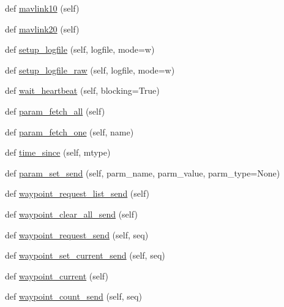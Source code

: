 \begin{DoxyCompactItemize}
\item 
def \hyperlink{classpymavlink_1_1mavutil_1_1mavfile_a2539d7b34226d566b9167f4c0bc5d7a4}{mavlink10} (self)
\item 
def \hyperlink{classpymavlink_1_1mavutil_1_1mavfile_a84eb9bd740dd761537c4fc16d0c436b7}{mavlink20} (self)
\item 
def \hyperlink{classpymavlink_1_1mavutil_1_1mavfile_a3cae7386bd175b00f8ab23316165f47a}{setup\+\_\+logfile} (self, logfile, mode=\textquotesingle{}w\textquotesingle{})
\item 
def \hyperlink{classpymavlink_1_1mavutil_1_1mavfile_af8bde63a7c980d24fd1679dca36242bf}{setup\+\_\+logfile\+\_\+raw} (self, logfile, mode=\textquotesingle{}w\textquotesingle{})
\item 
def \hyperlink{classpymavlink_1_1mavutil_1_1mavfile_a3776d63929d3183a65076cda4930b624}{wait\+\_\+heartbeat} (self, blocking=True)
\item 
def \hyperlink{classpymavlink_1_1mavutil_1_1mavfile_a5337d04307871f7ac873a17eb24b3180}{param\+\_\+fetch\+\_\+all} (self)
\item 
def \hyperlink{classpymavlink_1_1mavutil_1_1mavfile_a37e35b77e1bba0d32ec8ff37b79b0e23}{param\+\_\+fetch\+\_\+one} (self, name)
\item 
def \hyperlink{classpymavlink_1_1mavutil_1_1mavfile_a7749c322285d3e6c03f20b9f5931a9ba}{time\+\_\+since} (self, mtype)
\item 
def \hyperlink{classpymavlink_1_1mavutil_1_1mavfile_a28ff487ffd14ae2366c6dbc65f2c8612}{param\+\_\+set\+\_\+send} (self, parm\+\_\+name, parm\+\_\+value, parm\+\_\+type=None)
\item 
def \hyperlink{classpymavlink_1_1mavutil_1_1mavfile_a49ca013cb65639e9c5a5a436cb0a7756}{waypoint\+\_\+request\+\_\+list\+\_\+send} (self)
\item 
def \hyperlink{classpymavlink_1_1mavutil_1_1mavfile_a3c9b70e6763649129f677074bd73e41a}{waypoint\+\_\+clear\+\_\+all\+\_\+send} (self)
\item 
def \hyperlink{classpymavlink_1_1mavutil_1_1mavfile_af14da05495c0927374c4356a527ad406}{waypoint\+\_\+request\+\_\+send} (self, seq)
\item 
def \hyperlink{classpymavlink_1_1mavutil_1_1mavfile_a5ada29335e23c51ef5902135668d07db}{waypoint\+\_\+set\+\_\+current\+\_\+send} (self, seq)
\item 
def \hyperlink{classpymavlink_1_1mavutil_1_1mavfile_aba2948f65c3186269715ffcb4b7ddce5}{waypoint\+\_\+current} (self)
\item 
def \hyperlink{classpymavlink_1_1mavutil_1_1mavfile_a2d15b0cae8037dda7803879aa11a3857}{waypoint\+\_\+count\+\_\+send} (self, seq)

\end{DoxyCompactItemize}
